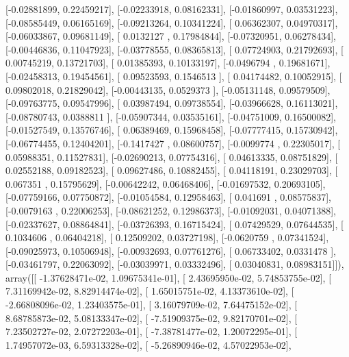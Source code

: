 \documentclass{article}
\begin{document}
       [-0.02881899,  0.22459217],
       [-0.02233918,  0.08162331],
       [-0.01860997,  0.03531223],
       [-0.08585449,  0.06165169],
       [-0.09213264,  0.10341224],
       [ 0.06362307,  0.04970317],
       [-0.06033867,  0.09681149],
       [ 0.0132127 ,  0.17984844],
       [-0.07320951,  0.06278434],
       [-0.00446836,  0.11047923],
       [-0.03778555,  0.08365813],
       [ 0.07724903,  0.21792693],
       [ 0.00745219,  0.13721703],
       [ 0.01385393,  0.10133197],
       [-0.0496794 ,  0.19681671],
       [-0.02458313,  0.19454561],
       [ 0.09523593,  0.1546513 ],
       [ 0.04174482,  0.10052915],
       [ 0.09802018,  0.21829042],
       [-0.00443135,  0.0529373 ],
       [-0.05131148,  0.09579509],
       [-0.09763775,  0.09547996],
       [ 0.03987494,  0.09738554],
       [-0.03966628,  0.16113021],
       [-0.08780743,  0.0388811 ],
       [-0.05907344,  0.03535161],
       [-0.04751009,  0.16500082],
       [-0.01527549,  0.13576746],
       [ 0.06389469,  0.15968458],
       [-0.07777415,  0.15730942],
       [-0.06774455,  0.12404201],
       [-0.1417427 ,  0.08600757],
       [-0.0099774 ,  0.22305017],
       [ 0.05988351,  0.11527831],
       [-0.02690213,  0.07754316],
       [ 0.04613335,  0.08751829],
       [ 0.02552188,  0.09182523],
       [ 0.09627486,  0.10882455],
       [ 0.04118191,  0.23029703],
       [ 0.067351  ,  0.15795629],
       [-0.00642242,  0.06468406],
       [-0.01697532,  0.20693105],
       [-0.07759166,  0.07750872],
       [-0.01054584,  0.12958463],
       [ 0.041691  ,  0.08575837],
       [-0.0079163 ,  0.22006253],
       [-0.08621252,  0.12986373],
       [-0.01092031,  0.04071388],
       [-0.02337627,  0.08864841],
       [-0.03726393,  0.16715424],
       [ 0.07429529,  0.07644535],
       [ 0.1034606 ,  0.06404218],
       [ 0.12509202,  0.03727198],
       [-0.0620759 ,  0.07341524],
       [-0.09025973,  0.10506948],
       [-0.00932693,  0.07761276],
       [ 0.06733402,  0.0331478 ],
       [-0.03461797,  0.22063092],
       [-0.03039971,  0.03332496],
       [ 0.03040831,  0.08983151]]), array([[ -1.37628471e-02,   1.09675341e-01],
       [  2.43695950e-02,   5.74853755e-02],
       [  7.31169942e-02,   8.82914474e-02],
       [  1.65015751e-02,   4.13373610e-02],
       [ -2.66808096e-02,   1.23403575e-01],
       [  3.16079709e-02,   7.64475152e-02],
       [  8.68785873e-02,   5.08133347e-02],
       [ -7.51909375e-02,   9.82170701e-02],
       [  7.23502727e-02,   2.07272203e-01],
       [ -7.38781477e-02,   1.20072295e-01],
       [  1.74957072e-03,   6.59313328e-02],
       [ -5.26890946e-02,   4.57022953e-02],
\end{document}
